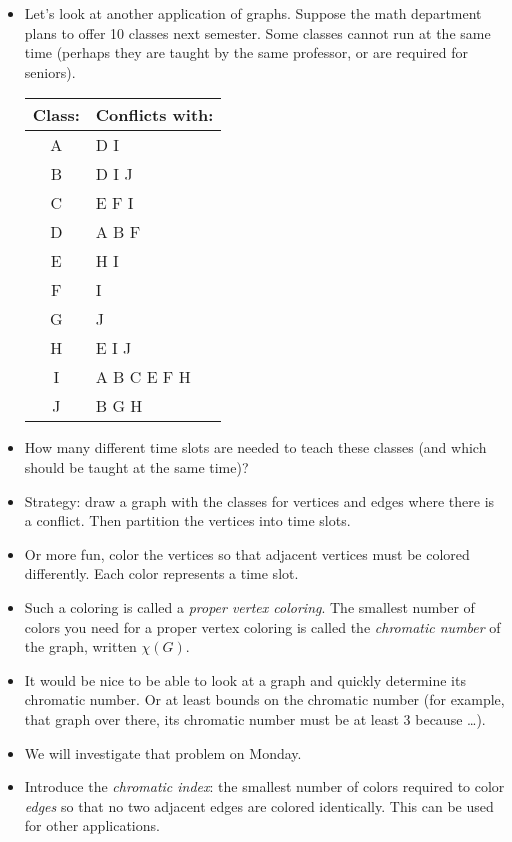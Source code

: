 \documentclass[12pt]{article}
\theoremstyle{plain}
\theoremstyle{definition}
\theoremstyle{remark}
\begin{document}
\begin{itemize}


\item Let's look at another application of graphs.  Suppose the math department plans to offer 10 classes next semester.  Some classes cannot run at the same time (perhaps they are taught by the same professor, or are required for seniors).

\begin{center}
\begin{tabular}{cl}
\textbf{Class:} & \textbf{Conflicts with:} \\ \hline
A & D I \\
B & D I J \\
C & E F I \\
D & A B F \\
E & H I\\
F & I\\
G & J \\
H & E I J\\
I & A B C E F H \\
J & B G H
\end{tabular}
\end{center}

\item How many different time slots are needed to teach these classes (and which should be taught at the same time)?

\item Strategy: draw a graph with the classes for vertices and edges where there is a conflict.  Then partition the vertices into time slots.

\item Or more fun, color the vertices so that adjacent vertices must be colored differently.  Each color represents a time slot.

\item Such a coloring is called a {\em proper vertex coloring}.  The smallest number of colors you need for a proper vertex coloring is called the {\em chromatic number} of the graph, written $\chi(G)$.

\item It would be nice to be able to look at a graph and quickly determine its chromatic number.  Or at least bounds on the chromatic number (for example, that graph over there, its chromatic number must be at least 3 because \ldots).

\item We will investigate that problem on Monday.

\item Introduce the \emph{chromatic index}: the smallest number of colors required to color \emph{edges} so that no two adjacent edges are colored identically.  This can be used for other applications.
\end{itemize}
\end{document}

